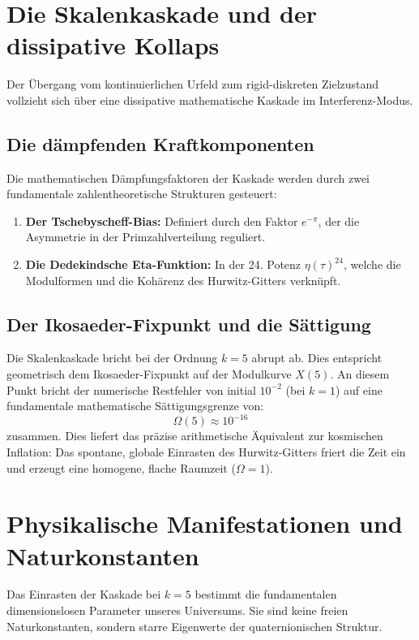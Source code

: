 \documentclass[11pt,a4paper]{article}
\theoremstyle{plain}
\theoremstyle{definition}
\numberwithin{equation}{section}
\begin{document}
\section{Die Skalenkaskade und der dissipative Kollaps}

Der Übergang vom kontinuierlichen Urfeld zum rigid-diskreten Zielzustand vollzieht sich über eine dissipative mathematische Kaskade im Interferenz-Modus.

\subsection{Die dämpfenden Kraftkomponenten}
Die mathematischen Dämpfungsfaktoren der Kaskade werden durch zwei fundamentale zahlentheoretische Strukturen gesteuert:
\begin{enumerate}
    \item \textbf{Der Tschebyscheff-Bias:} Definiert durch den Faktor $e^{-\pi}$, der die Asymmetrie in der Primzahlverteilung reguliert.
    \item \textbf{Die Dedekindsche Eta-Funktion:} In der 24. Potenz $\eta(\tau)^{24}$, welche die Modulformen und die Kohärenz des Hurwitz-Gitters verknüpft.
\end{enumerate}

\subsection{Der Ikosaeder-Fixpunkt und die Sättigung}
Die Skalenkaskade bricht bei der Ordnung $k=5$ abrupt ab. Dies entspricht geometrisch dem Ikosaeder-Fixpunkt auf der Modulkurve $X(5)$. An diesem Punkt bricht der numerische Restfehler von initial $10^{-2}$ (bei $k=1$) auf eine fundamentale mathematische Sättigungsgrenze von:
\begin{equation}
\Omega(5) \approx 10^{-16}
\end{equation}
zusammen. Dies liefert das präzise arithmetische Äquivalent zur kosmischen Inflation: Das spontane, globale Einrasten des Hurwitz-Gitters friert die Zeit ein und erzeugt eine homogene, flache Raumzeit ($\Omega = 1$).

\section{Physikalische Manifestationen und Naturkonstanten}

Das Einrasten der Kaskade bei $k=5$ bestimmt die fundamentalen dimensionslosen Parameter unseres Universums. Sie sind keine freien Naturkonstanten, sondern starre Eigenwerte der quaternionischen Struktur.
\end{document}
